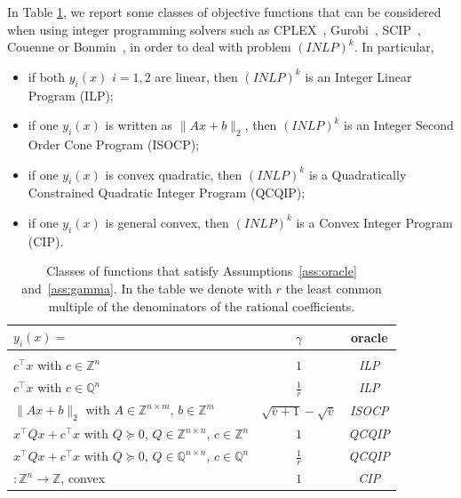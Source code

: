 \documentclass[preprint,12pt]{elsarticle}
\def\Q{\mathbb{Q}}
\def\Z{\mathbb{Z}}
\begin{document}
In Table \ref{tab:classes}, we report some classes of objective functions that can be considered when using integer programming solvers
such as CPLEX~\cite{cplex-url}, Gurobi~\cite{gurobi}, SCIP~\cite{GleixnerEiflerGallyetal.2017}, Couenne \cite{} or Bonmin~\cite{bonami2008algorithmic},
in order to deal with problem $(INLP)^k$.
In particular,
\begin{itemize}
 \item if both $y_i(x)$ $i=1,2$ are linear, then $(INLP)^k$ is an Integer Linear Program (ILP);
 \item if one $y_i(x)$ is written as $\|Ax + b\|_2$, then $(INLP)^k$ is an Integer Second Order Cone Program (ISOCP);
 \item if one $y_i(x)$ is convex quadratic, then $(INLP)^k$ is a Quadratically Constrained Quadratic Integer Program (QCQIP);
 \item if one $y_i(x)$ is general convex, then $(INLP)^k$ is a Convex Integer Program (CIP).
\end{itemize}

\begin{table}[h!]
\caption{Classes of functions that satisfy Assumptions~\ref{ass:oracle} and~\ref{ass:gamma}. In the table we denote with $r$ the least
common multiple of the denominators of the rational coefficients.}\label{tab:classes}
\begin{tabular}{||l| c| c||}
\hline\hline
$y_i(x)=$ & $\gamma$ & oracle\\
\hline\hline
& & \\[-1.5ex]
$  c^\top x$ with $c\in \Z^n$ & $1$ & \emph{ILP}\\[1.5ex]
$  c^\top x$ with $c\in \Q^n$ & $\frac 1 r$ & \emph{ILP}\\[1.5ex]
$  \|Ax +b\|_2$ with $A\in \Z^{n\times m}$, $b\in \Z^m$  & $\sqrt{\bar v+1}-\sqrt{\bar v}$ & \emph{ISOCP}\\[1.5ex]
$  x^\top Q x + c^\top x$ with $Q\succeq 0$, $Q\in \Z^{n\times n}$, $c\in \Z^n$  & $1$ & \emph{QCQIP}\\[1.5ex]
$  x^\top Q x + c^\top x$ with $Q\succeq 0$, $Q\in \Q^{n\times n}$, $c\in \Q^n$  & $\frac 1 r$ & \emph{QCQIP}\\[1.5ex]
$:\Z^n\rightarrow \Z$, convex & $1$& \emph{CIP}\\[1.0ex]
\hline\hline
\end{tabular}
\end{table}


\end{document}
